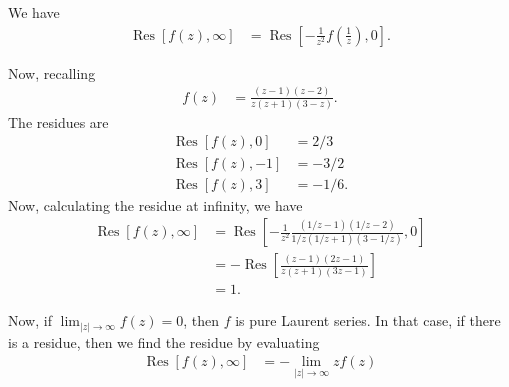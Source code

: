 \documentclass[10pt]{mypackage}
\DeclareMathOperator{\res}{Res}
\begin{document}
    We have
    \begin{align*}
      \res\left[ f(z), \infty\right] &= \res\left[ -\frac{1}{z^2}f\left( \frac{1}{z} \right),0 \right].
    \end{align*}
  \begin{example}
    Now, recalling
    \begin{align*}
      f(z) &= \frac{\left( z-1 \right)\left( z-2 \right)}{z\left( z+1 \right)\left( 3-z \right)}.
    \end{align*}
    The residues are
    \begin{align*}
      \res\left[ f(z),0 \right] &= 2/3\\
      \res\left[ f(z),-1 \right] &= -3/2\\
      \res\left[ f(z),3 \right] &= -1/6.
    \end{align*}
    Now, calculating the residue at infinity, we have
    \begin{align*}
      \res\left[f(z),\infty \right] &= \res\left[ -\frac{1}{z^2}\frac{\left( 1/z-1 \right)\left( 1/z-2 \right)}{1/z\left( 1/z + 1 \right)\left( 3-1/z \right)},0 \right]\\
                                    &= -\res\left[ \frac{\left( z-1 \right)\left( 2z-1 \right)}{z\left( z+1 \right)\left( 3z-1 \right)} \right]\\
                                    &= 1.
    \end{align*}
  \end{example}
  Now, if $\lim_{|z|\rightarrow\infty}f(z) = 0$, then $f$ is pure Laurent series. In that case, if there is a residue, then we find the residue by evaluating
  \begin{align*}
    \res\left[ f(z),\infty \right] &= -\lim_{|z|\rightarrow\infty} zf(z)
  \end{align*}
\end{document}
